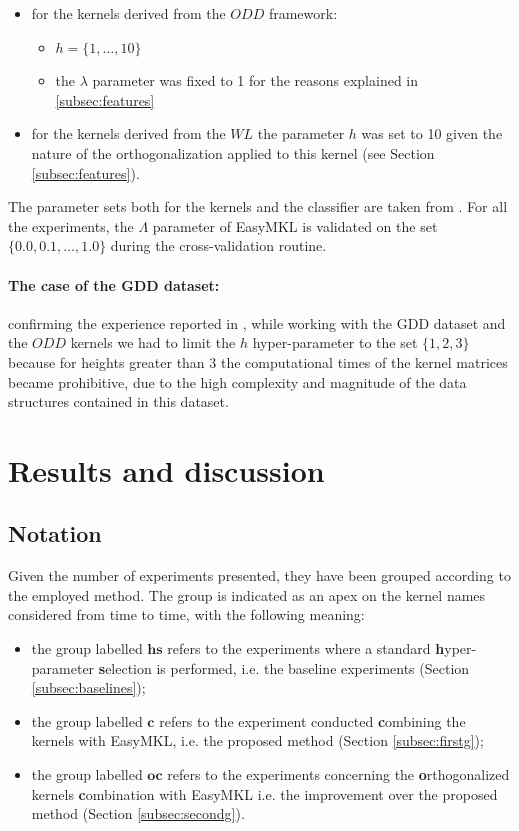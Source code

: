 \begin{itemize}
    \item for the kernels derived from the $ODD$ framework:
    \begin{itemize}
        \item $h=\{1,\dots,10\}$
        \item the $\lambda$ parameter was fixed to 1 for the reasons explained in \ref{subsec:features}
    \end{itemize}
    \item for the kernels derived from the $WL$ the parameter $h$ was set to 10
        given the nature of the orthogonalization applied to this kernel (see Section \ref{subsec:features}).
\end{itemize}
The parameter sets both for the kernels and the classifier are taken from \cite{rtesselli}.
For all the experiments, the $\Lambda$ parameter of EasyMKL is
validated on the set $\{0.0, 0.1,\dots,1.0\}$ during the cross-validation
routine.

\paragraph{The case of the GDD dataset:}
\label{par:gdd}
confirming the experience reported in \cite{rtesselli}, while working with the GDD
dataset and the $ODD$ kernels we had to limit the $h$ hyper-parameter to the set
$\{1,2,3\}$ because for heights greater than 3 the computational times of the
kernel matrices became prohibitive, due to the high complexity and magnitude
of the data structures contained in this dataset.


\section{Results and discussion}
\label{sec:results}

\subsection{Notation}
\label{subsec:notation}
Given the number of experiments presented, they have been grouped according
to the employed method.
The group is indicated as an apex on the kernel names considered from time to time, with the following meaning:
\begin{itemize}
    \item the group labelled $\boldsymbol{hs}$ refers to the experiments where a standard
        \textbf{h}yper-parameter \textbf{s}election is performed, i.e. the baseline experiments (Section \ref{subsec:baselines});
\item the group labelled $\boldsymbol{c}$ refers to the experiment conducted \textbf{c}ombining the 
        kernels with EasyMKL, i.e. the proposed method (Section \ref{subsec:firstg});
\item the group labelled $\boldsymbol{oc}$ refers to the experiments concerning the \textbf{o}rthogonalized
        kernels \textbf{c}ombination with EasyMKL i.e. the improvement over the proposed method (Section \ref{subsec:secondg}).
\end{itemize}

